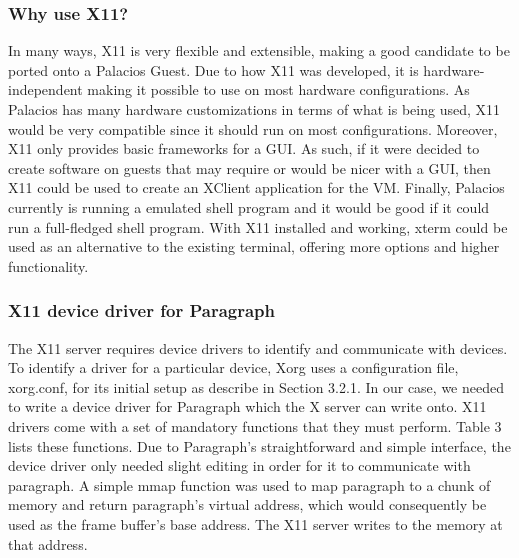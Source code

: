 \documentclass{acm_proc_article-sp}
\begin{document}
\subsubsection{Why use X11?}
In many ways, X11 is very flexible and extensible, making a good candidate to be ported onto a Palacios Guest. Due to how X11 was developed, it is hardware-independent making it possible to use on most hardware configurations. As Palacios has many hardware customizations in terms of what is being used, X11 would be very compatible since it should run on most configurations. Moreover, X11 only provides basic frameworks for a GUI. As such, if it were decided to create software on guests that may require or would be nicer with a GUI, then X11 could be used to create an XClient application for the VM. Finally, Palacios currently is running a emulated shell program and it would be good if it could run a full-fledged shell program. With X11 installed and working, xterm could be used as an alternative to the existing terminal, offering more options and higher functionality. 

\subsubsection{X11 device driver for Paragraph}
The X11 server requires device drivers to identify and communicate with devices.
To identify a driver for a particular device, Xorg uses a configuration file, xorg.conf, for its initial setup as describe in Section 3.2.1. 
In our case, we needed to write a device driver for Paragraph which the X server can
write onto.
X11 drivers come with a set of mandatory functions that they must perform. Table
3 lists these functions.
Due to Paragraph's straightforward and simple interface, the device driver only
needed slight editing in order for it to communicate with paragraph. A simple
mmap function was used to map paragraph to a chunk of memory and return
paragraph's virtual address, which would consequently be used as the frame
buffer's base address. The X11 server writes to the memory at that address.
\end{document}
